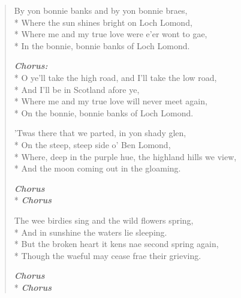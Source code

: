 \documentclass[9pt,twoside]{extarticle}
\makeatletter
\newenvironment{xverse}{
	\begin{verse}
	\fontsize{8.5}{10.5}\selectfont
}{
	\end{verse}
}
\newcommand{\chorusdef}{\textbf{\emph{Chorus:}}\\*}
\newcommand{\chorus@mark}[1][1]{%
\textbf{\emph{Chorus \ifthenelse{\equal{#1}{1}}{}{$\times$ #1}}}%
}
\newcommand{\chorusmark}[1][1]{%
\ifvmode%
\vspace{-0.5\stanzaskip}%
\chorus@mark[#1]%
\vspace{-0.5\stanzaskip}%
\else \\*%
\chorus@mark[#1]%
\fi%
}
\makeatother
\begin{document}
\begin{xverse}
By yon bonnie banks and by yon bonnie braes, \\*
Where the sun shines bright on Loch Lomond, \\*
Where me and my true love were e’er wont to gae, \\*
In the bonnie, bonnie banks of Loch Lomond.

\chorusdef
O ye’ll take the high road, and I’ll take the low road, \\*
And I’ll be in Scotland afore ye, \\*
Where me and my true love will never meet again, \\*
On the bonnie, bonnie banks of Loch Lomond.

’Twas there that we parted, in yon shady glen, \\*
On the steep, steep side o’ Ben Lomond, \\*
Where, deep in the purple hue, the highland hills we view, \\*
And the moon coming out in the gloaming.

\chorusmark

The wee birdies sing and the wild flowers spring, \\*
And in sunshine the waters lie sleeping. \\*
But the broken heart it kens nae second spring again, \\*
Though the waeful may cease frae their grieving.

\chorusmark
\end{xverse}
\end{document}
